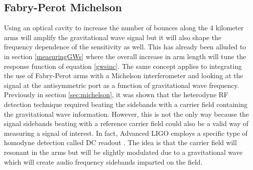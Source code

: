 		\subsection{Fabry-Perot Michelson}\label{FPmich}
		Using an optical cavity to increase the number of bounces along the 4 kilometer arms will amplify the gravitational wave signal but it will also shape the frequency dependence of the sensitivity as well.  This has already been alluded to in section \ref{measuringGWs} where the overall increase in arm length will tune the response function of equation \ref{gwsinc}.  The same concept applies to integrating the use of Fabry-Perot arms with a Michelson interferometer and looking at the signal at the antisymmetric port as a function of gravitational wave frequency. Previously in section \ref{sec:michelson}, it was shown that the heterodyne RF detection technique required beating the sidebands with a carrier field containing the gravitational wave information.  However, this is not the only way because the signal sidebands beating with a reference carrier field could also be a valid way of measuring a signal of interest. In fact, Advanced LIGO employs a specific type of homodyne detection called DC readout \cite{FritschelReadout}\cite{FritschelAdvancedLIGO}. The idea is that the carrier field will resonant in the arms but will be slightly modulated due to a gravitational wave which will create audio frequency sidebands imparted on the field.  
		

